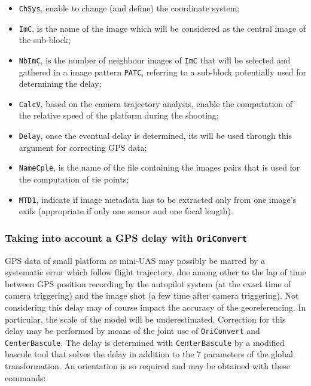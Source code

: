 \begin{itemize}
    \item {\tt ChSys}, enable to change (and define) the coordinate system;
    \item {\tt ImC}, is the name of the image which will be considered as the central image of the sub-block;
    \item {\tt NbImC}, is the number of neighbour images of {\tt ImC} that will be selected and gathered in a image pattern {\tt PATC}, referring to a sub-block potentially used for determining the delay;
                \item {\tt CalcV}, based on the camera trajectory analysis, enable the computation of the relative speed of the platform during the shooting;
                \item {\tt Delay}, once the eventual delay is determined, its will be used through this argument for correcting GPS data;
                \item {\tt NameCple}, is the name of the file containing the images pairs that is used for the computation of tie points;
                \item {\tt MTD1}, indicate if image metadata has to be extracted only from one image's exifs (appropriate if only one sensor and one focal length).
\end{itemize}
\vspace{\baselineskip}

\subsubsection{Taking into account a GPS delay with {\tt OriConvert}}\label{OriConvert:GPSdelay}

GPS data of small platform as mini-UAS may possibly be marred by a systematic error which follow flight trajectory, due among other to the lap of time between GPS position recording by the autopilot system (at the exact time of camera triggering) and the image shot (a few time after camera triggering). Not considering this delay may of course impact the accuracy of the georeferencing. In particular, the scale of the model will be underestimated. Correction for this delay may be performed by means of the joint use of {\tt OriConvert} and {\tt CenterBascule}. The delay is determined with {\tt CenterBascule} by a modified bascule tool that solves the delay in addition to the 7 parameters of the global transformation. An orientation is so required and may be obtained with these commands:

